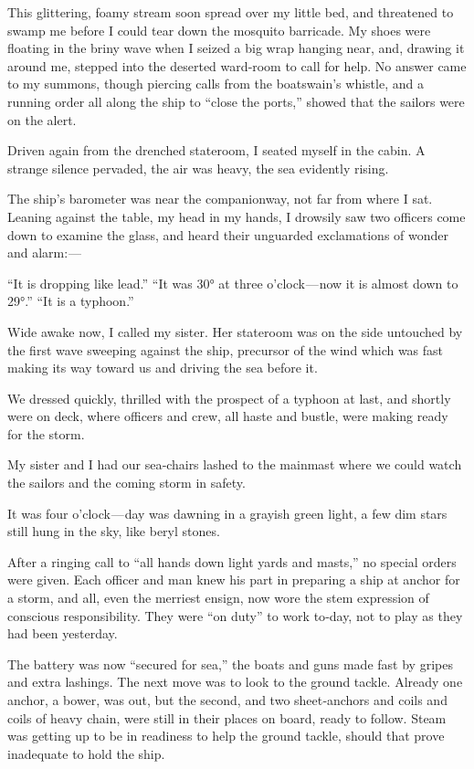 \documentclass[12pt]{book}
\begin{document}
This glittering, foamy stream soon spread over my little bed, and threatened
to swamp me before I could tear down the mosquito barricade. My shoes were
floating in the briny wave when I seized a big wrap hanging near, and, drawing
it around me, stepped into the deserted ward‐room to call for help. No answer
came to my summons, though piercing calls from the boatswain’s whistle, and a
running order all along the ship to “close the ports,” showed that the sailors were
on the alert.

Driven again from the drenched stateroom, I seated myself in the cabin. A
strange silence pervaded, the air was heavy, the sea evidently rising.

The ship’s barometer was near the companionway, not far from where I sat.
Leaning against the table, my head in my hands, I drowsily saw two officers come
down to examine the glass, and heard their unguarded exclamations of wonder
and alarm: —

“It is dropping like lead.” “It was 30° at three o’clock — now it is almost down
to 29°.” “It is a typhoon.”

Wide awake now, I called my sister. Her stateroom was on the side untouched
by the first wave sweeping against the ship, precursor of the wind which was fast
making its way toward us and driving the sea before it.

We dressed quickly, thrilled with the prospect of a typhoon at last, and shortly
were on deck, where officers and crew, all haste and bustle, were making ready
for the storm.

My sister and I had our sea‐chairs lashed to the mainmast where we could
watch the sailors and the coming storm in safety.

It was four o’clock — day was dawning in a grayish green light, a few dim
stars still hung in the sky, like beryl stones.

After a ringing call to “all hands down light yards and masts,” no special orders
were given. Each officer and man knew his part in preparing a ship at anchor
for a storm, and all, even the merriest ensign, now wore the stem expression of
conscious responsibility. They were “on duty” to work to‐day, not to play as they
had been yesterday.

The battery was now “secured for sea,” the boats and guns made fast by gripes
and extra lashings. The next move was to look to the ground tackle. Already one
anchor, a bower, was out, but the second, and two sheet‐anchors and coils and
coils of heavy chain, were still in their places on board, ready to follow. Steam
was getting up to be in readiness to help the ground tackle, should that prove
inadequate to hold the ship.
\end{document}
